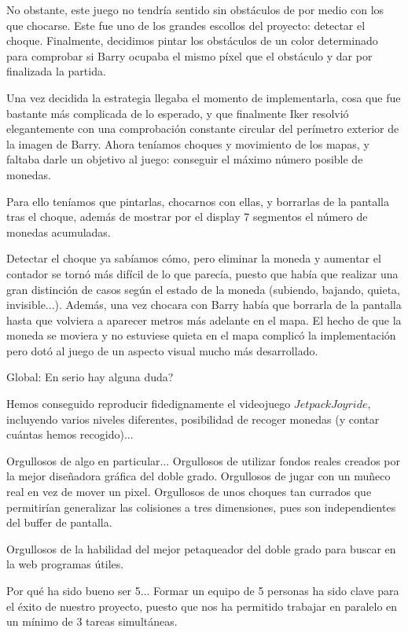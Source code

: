 \documentclass[11pt, a4paper, spanish, openright, twoside]{book}
\begin{document}
No obstante, este juego no tendría sentido sin obstáculos de por medio con los que chocarse.
Este fue uno de los grandes escollos del proyecto: detectar el choque.
Finalmente, decidimos pintar los obstáculos de un color determinado para comprobar si Barry ocupaba el mismo píxel que el obstáculo y dar por finalizada la partida.

Una vez decidida la estrategia llegaba el momento de implementarla, cosa que fue bastante más complicada de lo esperado, y que finalmente Iker resolvió elegantemente con una comprobación constante circular del perímetro exterior de la imagen de Barry.
Ahora teníamos choques y movimiento de los mapas, y faltaba darle un objetivo al juego: conseguir el máximo número posible de monedas.

Para ello teníamos que pintarlas, chocarnos con ellas, y borrarlas de la pantalla tras el choque, además de mostrar por el display 7 segmentos el número de monedas acumuladas.

Detectar el choque ya sabíamos cómo, pero eliminar la moneda y aumentar el contador se tornó más difícil de lo que parecía, puesto que había que realizar una gran distinción de casos según el estado de la moneda (subiendo, bajando, quieta, invisible...). Además, una vez chocara con Barry había que borrarla de la pantalla hasta que volviera a aparecer metros más adelante en el mapa. El hecho de que la moneda se moviera y no estuviese quieta en el mapa complicó la implementación pero dotó al juego de un aspecto visual mucho más desarrollado.

Global:
En serio hay alguna duda?

Hemos conseguido reproducir fidedignamente el videojuego $Jetpack Joyride$, incluyendo varios niveles diferentes, posibilidad de recoger monedas (y contar cuántas hemos recogido)...

Orgullosos de algo en particular...
Orgullosos de utilizar fondos reales creados por la mejor diseñadora gráfica del doble grado. Orgullosos de jugar con un muñeco real en vez de mover un pixel. Orgullosos de unos choques tan
 currados que permitirían generalizar las colisiones a tres dimensiones, pues son independientes del buffer de pantalla. 

Orgullosos de la habilidad del mejor petaqueador del doble grado para buscar en la web programas útiles. 

Por qué ha sido bueno ser 5...
Formar un equipo de 5 personas ha sido clave para el éxito de nuestro proyecto, puesto que nos ha permitido trabajar en paralelo en un mínimo de 3 tareas simultáneas. 
\end{document}
